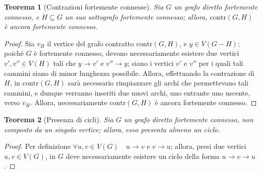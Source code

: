 \documentclass[14pt]{extreport}
\newtheorem{theorem}{Teorema}[subsection]
\theoremstyle{definition}
\theoremstyle{definition}
\begin{document}
\begin{theorem}[Contrazioni fortemente connesse]
    \label{contrazioni fortemente connesse}
    Sia $G$ un grafo diretto fortemente connesso, e $H \subseteq G$ un suo sottografo fortemente connesso; allora, $\mathrm{contr}(G, H)$ è ancora fortemente connesso.
\end{theorem}

\begin{proof}
    Sia $v_H$ il vertice del grafo contratto $\mathrm{contr}(G, H)$, e $y \in V(G - H)$; poiché $G$ è fortemente connesso, devono necessariamente esistere due vertici $v', v'' \in V(H)$ tali che $y \rightarrow v'$ e $v'' \rightarrow y$; siano i vertici $v'$ e $v''$ per i quali tali cammini siano di minor lunghezza possibile. Allora, effettuando la contrazione di $H$, in $\mathrm{contr}(G, H)$ sarà necessario rimpiazzare gli archi che permettevano tali cammini, e dunque verranno inseriti due nuovi archi, uno entrante uno uscente, verso $v_H$. Allora, necessariamente $\mathrm{contr}(G, H)$ è ancora fortemente connesso.
\end{proof}

\begin{theorem}[Presenza di cicli]
    \label{presenza di cicli fort conn}
    Sia $G$ un grafo diretto fortemente connesso, non composto da un singolo vertice; allora, esso presenta almeno un ciclo.
\end{theorem}

\begin{proof}
    Per definizione $\forall u, v \in V(G) \quad u \rightarrow v$ e $v \rightarrow u$; allora, presi due vertici $u, v \in V(G)$, in $G$ deve necessariamente esistere un ciclo della forma $u \rightarrow v \rightarrow u$.
\end{proof}
\end{document}
